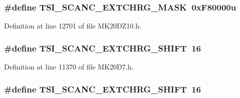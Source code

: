 \subsubsection[{\texorpdfstring{T\+S\+I\+\_\+\+S\+C\+A\+N\+C\+\_\+\+E\+X\+T\+C\+H\+R\+G\+\_\+\+M\+A\+SK}{TSI_SCANC_EXTCHRG_MASK}}]{\setlength{\rightskip}{0pt plus 5cm}\#define T\+S\+I\+\_\+\+S\+C\+A\+N\+C\+\_\+\+E\+X\+T\+C\+H\+R\+G\+\_\+\+M\+A\+SK~0x\+F80000u}\hypertarget{group___t_s_i___register___masks_gab5798996c8488e915c2db48de5f5d0bb}{}\label{group___t_s_i___register___masks_gab5798996c8488e915c2db48de5f5d0bb}


Definition at line 12701 of file M\+K20\+D\+Z10.\+h.

\subsubsection[{\texorpdfstring{T\+S\+I\+\_\+\+S\+C\+A\+N\+C\+\_\+\+E\+X\+T\+C\+H\+R\+G\+\_\+\+S\+H\+I\+FT}{TSI_SCANC_EXTCHRG_SHIFT}}]{\setlength{\rightskip}{0pt plus 5cm}\#define T\+S\+I\+\_\+\+S\+C\+A\+N\+C\+\_\+\+E\+X\+T\+C\+H\+R\+G\+\_\+\+S\+H\+I\+FT~16}\hypertarget{group___t_s_i___register___masks_ga5381f1f7b0d3256890453050ef35486d}{}\label{group___t_s_i___register___masks_ga5381f1f7b0d3256890453050ef35486d}


Definition at line 11370 of file M\+K20\+D7.\+h.

\subsubsection[{\texorpdfstring{T\+S\+I\+\_\+\+S\+C\+A\+N\+C\+\_\+\+E\+X\+T\+C\+H\+R\+G\+\_\+\+S\+H\+I\+FT}{TSI_SCANC_EXTCHRG_SHIFT}}]{\setlength{\rightskip}{0pt plus 5cm}\#define T\+S\+I\+\_\+\+S\+C\+A\+N\+C\+\_\+\+E\+X\+T\+C\+H\+R\+G\+\_\+\+S\+H\+I\+FT~16}\hypertarget{group___t_s_i___register___masks_ga5381f1f7b0d3256890453050ef35486d}{}\label{group___t_s_i___register___masks_ga5381f1f7b0d3256890453050ef35486d}


